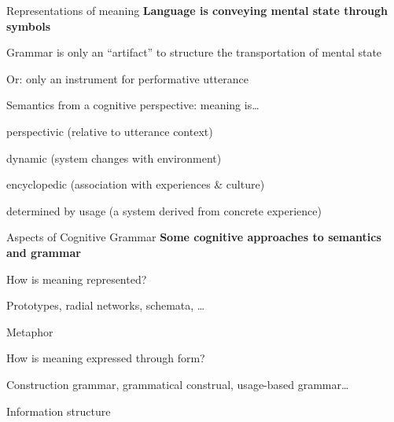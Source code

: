 \documentclass[aspectratio=169,cramped]{beamer}
\let\tempone\itemize
\let\temptwo\enditemize
\renewenvironment{itemize}{\tempone\addtolength{\itemsep}{-0\baselineskip}\addtolength{\parskip}{-0.2\baselineskip}}{\temptwo}
\newcommand{\ex}[1]{{\color{teal} #1}}
\begin{document}
\begin{frame}{Representations of meaning}
	\textbf{Language is conveying mental state through symbols}
  \begin{itemize}
  \item Grammar is only an ``artifact'' to structure the transportation of mental state
    \begin{itemize}
    \item Or: only an instrument for performative utterance
    \end{itemize}
  \item Semantics from a cognitive perspective: meaning is\ldots
    \begin{itemize}
    \item perspectivic (relative to utterance context)
    \item dynamic (system changes with environment)
    \item encyclopedic (association with experiences \& culture)
    \item determined by usage (a system derived from concrete experience)
    \end{itemize}
  \end{itemize}
\end{frame}

\begin{frame}{Aspects of Cognitive Grammar}
	\textbf{Some cognitive approaches to semantics and grammar}
  \begin{itemize}
    \item How is meaning represented?
      \begin{itemize}
      \item \ex{Prototypes, radial networks, schemata, \ldots}
      \item \ex{Metaphor}
      \end{itemize}
    \item How is meaning expressed through form?
      \begin{itemize}
      \item \ex{Construction grammar, grammatical construal, usage-based grammar\ldots}
      \item \ex{Information structure}
      \end{itemize}
  \end{itemize}
\end{frame}
\end{document}
